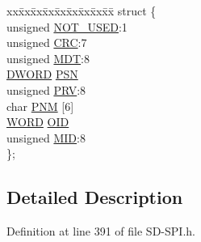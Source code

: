\begin{DoxyCompactItemize}
\begin{tabbing}
\end{tabbing}\item 
\begin{tabbing}
xx\=xx\=xx\=xx\=xx\=xx\=xx\=xx\=xx\=\kill
struct \{\\
\>unsigned \hyperlink{union_c_i_d_a75098a81c518e187eb7a43cc63ad1a9e}{NOT\_USED}:1\\
\>unsigned \hyperlink{union_c_i_d_ab9e9fe7c42064ff2fcd04adcda3a6919}{CRC}:7\\
\>unsigned \hyperlink{union_c_i_d_aacb515a9b50f4dd733a1a8b550d1d2be}{MDT}:8\\
\>\hyperlink{_generic_type_defs_8h_ad342ac907eb044443153a22f964bf0af}{DWORD} \hyperlink{union_c_i_d_a0b91d996158c8f32cc8719881ec1c35b}{PSN}\\
\>unsigned \hyperlink{union_c_i_d_ae7063e98e2b95855058a6b78b92f1d90}{PRV}:8\\
\>char \hyperlink{union_c_i_d_a199716392bb65c6b1f6d57036c8f9a69}{PNM} \mbox{[}6\mbox{]}\\
\>\hyperlink{_generic_type_defs_8h_a2b0e863dadf920709ec53d9088ee7c91}{WORD} \hyperlink{union_c_i_d_a11897b65a89ff97725a26be0a7254aea}{OID}\\
\>unsigned \hyperlink{union_c_i_d_ab8f6a6de0f016ac105519fc2de4c5780}{MID}:8\\
\}; \\

\end{tabbing}\end{DoxyCompactItemize}


\subsection{Detailed Description}


Definition at line 391 of file S\+D-\/\+S\+P\+I.\+h.



